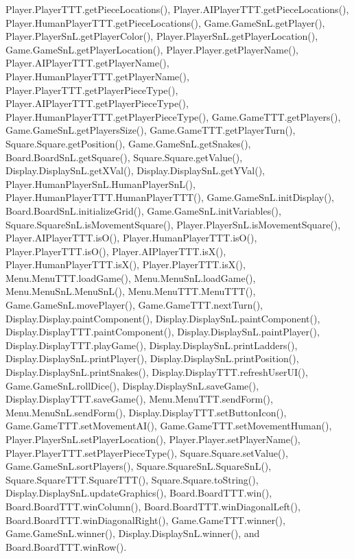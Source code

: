 Player.\+Player\+T\+T\+T.\+get\+Piece\+Locations(), Player.\+A\+I\+Player\+T\+T\+T.\+get\+Piece\+Locations(), Player.\+Human\+Player\+T\+T\+T.\+get\+Piece\+Locations(), Game.\+Game\+Sn\+L.\+get\+Player(), Player.\+Player\+Sn\+L.\+get\+Player\+Color(), Player.\+Player\+Sn\+L.\+get\+Player\+Location(), Game.\+Game\+Sn\+L.\+get\+Player\+Location(), Player.\+Player.\+get\+Player\+Name(), Player.\+A\+I\+Player\+T\+T\+T.\+get\+Player\+Name(), Player.\+Human\+Player\+T\+T\+T.\+get\+Player\+Name(), Player.\+Player\+T\+T\+T.\+get\+Player\+Piece\+Type(), Player.\+A\+I\+Player\+T\+T\+T.\+get\+Player\+Piece\+Type(), Player.\+Human\+Player\+T\+T\+T.\+get\+Player\+Piece\+Type(), Game.\+Game\+T\+T\+T.\+get\+Players(), Game.\+Game\+Sn\+L.\+get\+Players\+Size(), Game.\+Game\+T\+T\+T.\+get\+Player\+Turn(), Square.\+Square.\+get\+Position(), Game.\+Game\+Sn\+L.\+get\+Snakes(), Board.\+Board\+Sn\+L.\+get\+Square(), Square.\+Square.\+get\+Value(), Display.\+Display\+Sn\+L.\+get\+X\+Val(), Display.\+Display\+Sn\+L.\+get\+Y\+Val(), Player.\+Human\+Player\+Sn\+L.\+Human\+Player\+Sn\+L(), Player.\+Human\+Player\+T\+T\+T.\+Human\+Player\+T\+T\+T(), Game.\+Game\+Sn\+L.\+init\+Display(), Board.\+Board\+Sn\+L.\+initialize\+Grid(), Game.\+Game\+Sn\+L.\+init\+Variables(), Square.\+Square\+Sn\+L.\+is\+Movement\+Square(), Player.\+Player\+Sn\+L.\+is\+Movement\+Square(), Player.\+A\+I\+Player\+T\+T\+T.\+is\+O(), Player.\+Human\+Player\+T\+T\+T.\+is\+O(), Player.\+Player\+T\+T\+T.\+is\+O(), Player.\+A\+I\+Player\+T\+T\+T.\+is\+X(), Player.\+Human\+Player\+T\+T\+T.\+is\+X(), Player.\+Player\+T\+T\+T.\+is\+X(), Menu.\+Menu\+T\+T\+T.\+load\+Game(), Menu.\+Menu\+Sn\+L.\+load\+Game(), Menu.\+Menu\+Sn\+L.\+Menu\+Sn\+L(), Menu.\+Menu\+T\+T\+T.\+Menu\+T\+T\+T(), Game.\+Game\+Sn\+L.\+move\+Player(), Game.\+Game\+T\+T\+T.\+next\+Turn(), Display.\+Display.\+paint\+Component(), Display.\+Display\+Sn\+L.\+paint\+Component(), Display.\+Display\+T\+T\+T.\+paint\+Component(), Display.\+Display\+Sn\+L.\+paint\+Player(), Display.\+Display\+T\+T\+T.\+play\+Game(), Display.\+Display\+Sn\+L.\+print\+Ladders(), Display.\+Display\+Sn\+L.\+print\+Player(), Display.\+Display\+Sn\+L.\+print\+Position(), Display.\+Display\+Sn\+L.\+print\+Snakes(), Display.\+Display\+T\+T\+T.\+refresh\+User\+U\+I(), Game.\+Game\+Sn\+L.\+roll\+Dice(), Display.\+Display\+Sn\+L.\+save\+Game(), Display.\+Display\+T\+T\+T.\+save\+Game(), Menu.\+Menu\+T\+T\+T.\+send\+Form(), Menu.\+Menu\+Sn\+L.\+send\+Form(), Display.\+Display\+T\+T\+T.\+set\+Button\+Icon(), Game.\+Game\+T\+T\+T.\+set\+Movement\+A\+I(), Game.\+Game\+T\+T\+T.\+set\+Movement\+Human(), Player.\+Player\+Sn\+L.\+set\+Player\+Location(), Player.\+Player.\+set\+Player\+Name(), Player.\+Player\+T\+T\+T.\+set\+Player\+Piece\+Type(), Square.\+Square.\+set\+Value(), Game.\+Game\+Sn\+L.\+sort\+Players(), Square.\+Square\+Sn\+L.\+Square\+Sn\+L(), Square.\+Square\+T\+T\+T.\+Square\+T\+T\+T(), Square.\+Square.\+to\+String(), Display.\+Display\+Sn\+L.\+update\+Graphics(), Board.\+Board\+T\+T\+T.\+win(), Board.\+Board\+T\+T\+T.\+win\+Column(), Board.\+Board\+T\+T\+T.\+win\+Diagonal\+Left(), Board.\+Board\+T\+T\+T.\+win\+Diagonal\+Right(), Game.\+Game\+T\+T\+T.\+winner(), Game.\+Game\+Sn\+L.\+winner(), Display.\+Display\+Sn\+L.\+winner(), and Board.\+Board\+T\+T\+T.\+win\+Row().

